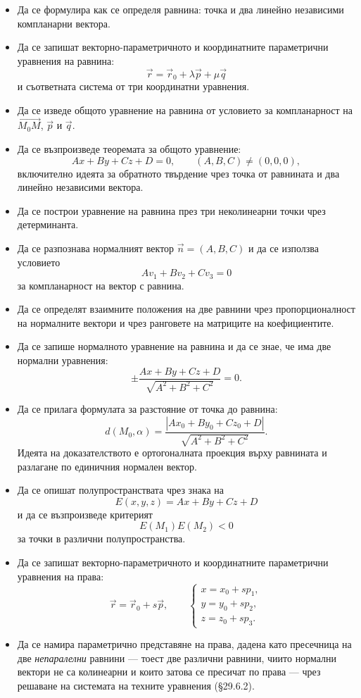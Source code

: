 \begin{itemize}
\item Да се формулира как се определя равнина: точка и два линейно независими компланарни вектора.

\item Да се запишат векторно-параметричното и координатните параметрични уравнения на равнина:
\[
\vec r=\vec r_0+\lambda\vec p+\mu\vec q
\]
и съответната система от три координатни уравнения.

\item Да се изведе общото уравнение на равнина от условието за компланарност на $\overrightarrow{M_0M}$, $\vec p$ и $\vec q$.

\item Да се възпроизведе теоремата за общото уравнение:
\[
Ax+By+Cz+D=0,\qquad (A,B,C)\ne(0,0,0),
\]
включително идеята за обратното твърдение чрез точка от равнината и два линейно независими вектора.

\item Да се построи уравнение на равнина през три неколинеарни точки чрез детерминанта.

\item Да се разпознава нормалният вектор $\vec n=(A,B,C)$ и да се използва условието
\[
Av_1+Bv_2+Cv_3=0
\]
за компланарност на вектор с равнина.

\item Да се определят взаимните положения на две равнини чрез пропорционалност на нормалните вектори и чрез ранговете на матриците на коефициентите.

\item Да се запише нормалното уравнение на равнина и да се знае, че има две нормални уравнения:
\[
\pm\frac{Ax+By+Cz+D}{\sqrt{A^2+B^2+C^2}}=0.
\]

\item Да се прилага формулата за разстояние от точка до равнина:
\[
d(M_0,\alpha)=
\frac{|Ax_0+By_0+Cz_0+D|}
{\sqrt{A^2+B^2+C^2}}.
\]
Идеята на доказателството е ортогоналната проекция върху равнината и разлагане по единичния нормален вектор.

\item Да се опишат полупространствата чрез знака на
\[
E(x,y,z)=Ax+By+Cz+D
\]
и да се възпроизведе критерият
\[
E(M_1)E(M_2)<0
\]
за точки в различни полупространства.

\item Да се запишат векторно-параметричното и координатните параметрични уравнения на права:
\[
\vec r=\vec r_0+s\vec p,
\qquad
\begin{cases}
x=x_0+sp_1,\\
y=y_0+sp_2,\\
z=z_0+sp_3.
\end{cases}
\]

\item Да се намира параметрично представяне на права, дадена като пресечница на две \emph{непаралелни} равнини --- тоест две различни равнини, чиито нормални вектори не са колинеарни и които затова се пресичат по права --- чрез решаване на системата на техните уравнения (\S29.6.2).
\end{itemize}

